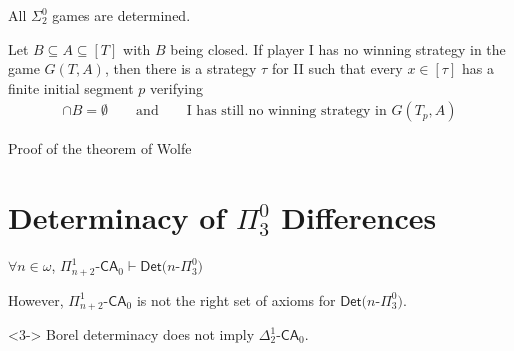 \documentclass{beamer} %
\begin{document}
\begin{frame}
    \begin{theorem}
        All $\Sigma^0_2$ games are determined.\label{Sigma2Det}
    \end{theorem}
\end{frame}


\begin{frame}
    \begin{lemma}
        Let $B \subseteq A \subseteq [T]$ with $B$ being closed. If player I has no winning strategy in the 
        game $G(T,A)$, then there is a strategy $\tau$ for II such that every $x \in [\tau]$ has a finite 
        initial segment $p$ verifying \begin{align*}
            [T_p] \cap B = \emptyset \qquad \text{and} \qquad \text{I has still no winning strategy in }G(T_p,A) 
        \end{align*} 
    \end{lemma}
\end{frame}


\begin{frame}{Proof of the theorem of Wolfe}
    
\end{frame}



\section{Determinacy of $\Pi^0_3$ Differences}
\begin{frame}{} 
    \begin{theorem}
        $\forall n \in \omega$, $\Pi^1_{n+2}$-$\mathsf{CA}_0 \vdash \mathsf{Det}(n$-$\Pi^0_3)$
    \end{theorem}
    \pause
    However, $\Pi^1_{n+2}$-$\mathsf{CA}_0$ is not the right set of axioms for 
    $\mathsf{Det}(n$-$\Pi^0_3)$.

    \begin{theorem}<3->
        Borel determinacy does not imply $\Delta^1_2$-$\mathsf{CA}_0$.
    \end{theorem}
\end{frame}
\end{document}

